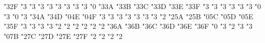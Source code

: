\mathchardef \lessapprox   "3\amsafam 2F
\mathchardef \eqslantless   "3
\mathchardef \eqslantgtr   "3
\mathchardef \curlyeqprec   "3
\mathchardef \curlyeqsucc   "3
\mathchardef \preccurlyeq   "3
\mathchardef \leqq   "3
\mathchardef \leqslant   "3
\mathchardef \lessgtr   "3
\mathchardef \backprime   "0
\mathchardef \risingdotseq   "3\amsafam 3A
\mathchardef \fallingdotseq   "3\amsafam 3B
\mathchardef \succcurlyeq   "3\amsafam 3C
\mathchardef \geqq   "3\amsafam 3D
\mathchardef \geqslant   "3\amsafam 3E
\mathchardef \gtrless   "3\amsafam 3F
\mathchardef \sqsubset   "3
\mathchardef \sqsupset   "3
\mathchardef \vartriangleright   "3
\mathchardef \vartriangleleft   "3
\mathchardef \trianglerighteq   "3
\mathchardef \trianglelefteq   "3
\mathchardef \bigstar   "0
\mathchardef \between   "3
\mathchardef \blacktriangledown   "0
\mathchardef \blacktriangleright   "3
\mathchardef \blacktriangleleft   "3\amsafam 4A
\mathchardef \vartriangle   "3\amsafam 4D
\mathchardef \blacktriangle   "0\amsafam 4E
\mathchardef \triangledown   "0\amsafam 4F
\mathchardef \eqcirc   "3
\mathchardef \lesseqgtr   "3
\mathchardef \gtreqless   "3
\mathchardef \lesseqqgtr   "3
\mathchardef \gtreqqless   "3
\mathchardef \Rrightarrow   "3
\mathchardef \Lleftarrow   "3
\mathchardef \veebar   "2
\mathchardef \barwedge   "2\amsafam 5A
\mathchardef \doublebarwedge   "2\amsafam 5B
\mathchardef \angle   "0\amsafam 5C
\mathchardef \measuredangle   "0\amsafam 5D
\mathchardef \sphericalangle   "0\amsafam 5E
\mathchardef \varpropto   "3\amsafam 5F
\mathchardef \smallsmile   "3
\mathchardef \smallfrown   "3
\mathchardef \Subset   "3
\mathchardef \Supset   "3
\mathchardef \Cup   "2
\mathchardef \Cap   "2
\mathchardef \curlywedge   "2
\mathchardef \curlyvee   "2
\mathchardef \leftthreetimes   "2
\mathchardef \rightthreetimes   "2
\mathchardef \subseteqq   "3\amsafam 6A
\mathchardef \supseteqq   "3\amsafam 6B
\mathchardef \bumpeq   "3\amsafam 6C
\mathchardef \Bumpeq   "3\amsafam 6D
\mathchardef \lll   "3\amsafam 6E
\mathchardef \ggg   "3\amsafam 6F
\def \ulcorner {\delimiter"4\amsafam 70\amsafam 70 }
\def \urcorner {\delimiter"5\amsafam 71\amsafam 71 }
\mathchardef \circledS   "0
\mathchardef \pitchfork   "3
\mathchardef \dotplus   "2
\mathchardef \backsim   "3
\mathchardef \backsimeq   "3
\def \llcorner {\delimiter"4\amsafam 78\amsafam 78 }
\def \lrcorner {\delimiter"5\amsafam 79\amsafam 79 }
\mathchardef \complement   "0\amsafam 7B
\mathchardef \intercal   "2\amsafam 7C
\mathchardef \circledcirc   "2\amsafam 7D
\mathchardef \circledast   "2\amsafam 7E
\mathchardef \circleddash   "2\amsafam 7F
\mathchardef \rhd   "2
\mathchardef \lhd   "2
\mathchardef \unrhd   "2
\mathchardef \unlhd   "2

